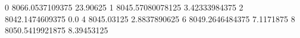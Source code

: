 0 8066.0537109375 23.90625
1 8045.57080078125 3.42333984375
2 8042.1474609375 0.0
4 8045.03125 2.8837890625
6 8049.2646484375 7.1171875
8 8050.5419921875 8.39453125
